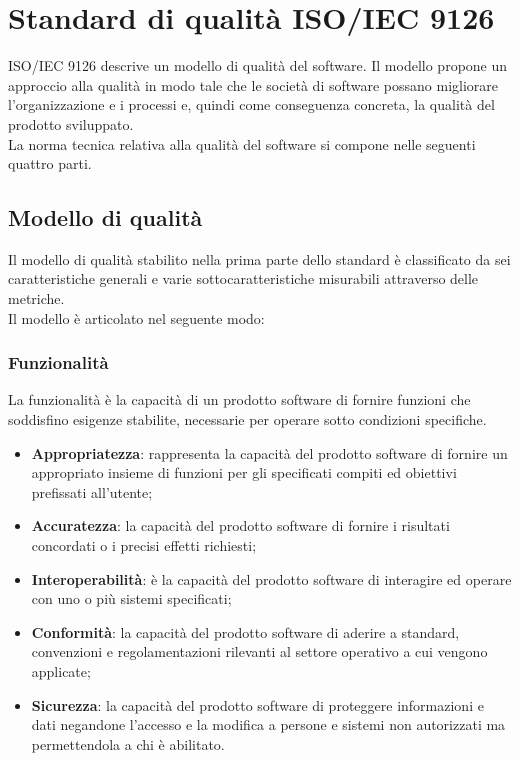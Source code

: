 \section{Standard di qualità ISO/IEC 9126}
ISO/IEC 9126 descrive un modello di qualità del software. Il modello propone un approccio alla qualità in modo tale che le società di software possano migliorare l'organizzazione e i processi e, quindi come conseguenza concreta, la qualità del prodotto sviluppato. \\
La norma tecnica relativa alla qualità del software si compone nelle seguenti quattro parti.

\subsection{Modello di qualità}
Il modello di qualità stabilito nella prima parte dello standard è classificato da sei caratteristiche generali e varie sottocaratteristiche misurabili attraverso delle metriche. \\
Il modello è articolato nel seguente modo:

\subsubsection{Funzionalità}
La funzionalità è la capacità di un prodotto software di fornire funzioni che soddisfino esigenze stabilite, necessarie per operare sotto condizioni specifiche.

\begin{itemize}

	\item \textbf{Appropriatezza}: rappresenta la capacità del prodotto software di fornire un appropriato insieme di funzioni per gli specificati compiti ed obiettivi prefissati all'utente;
	
    \item \textbf{Accuratezza}: la capacità del prodotto software di fornire i risultati concordati o i precisi effetti richiesti;
    
    \item \textbf{Interoperabilità}: è la capacità del prodotto software di interagire ed operare con uno o più sistemi specificati;
    
    \item \textbf{Conformità}: la capacità del prodotto software di aderire a standard, convenzioni e regolamentazioni rilevanti al settore operativo a cui vengono applicate;
    
    \item \textbf{Sicurezza}: la capacità del prodotto software di proteggere informazioni e dati negandone l'accesso e la modifica a persone e sistemi non autorizzati ma permettendola a chi è abilitato.    
\end{itemize}

